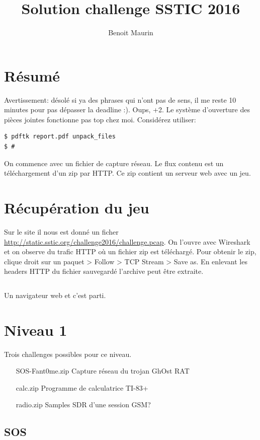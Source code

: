 \documentclass[14pt]{article}
\title{Solution challenge SSTIC 2016}
\author{Benoit Maurin}
\let\oldinputminted\inputminted
\renewcommand{\inputminted}[2]{\begin{tcolorbox}\oldinputminted[breaklines]{#1}{#2}\end{tcolorbox}}
\begin{document}
\date{}

\maketitle

\tableofcontents

\section*{Résumé}
Avertissement: désolé si ya des phrases qui n'ont pas de sens, il me reste 10 minutes pour pas dépasser la deadline :).
Oups, +2. Le système d'ouverture des pièces jointes fonctionne pas top chez moi.
Considérez utiliser:
\begin{verbatim}
$ pdftk report.pdf unpack_files 
$ #
\end{verbatim}

On commence avec un fichier de capture réseau. Le flux contenu est un téléchargement d'un zip par HTTP.
Ce zip contient un serveur web avec un jeu.

\section{Récupération du jeu}

Sur le site il nous est donné un ficher \url{http://static.sstic.org/challenge2016/challenge.pcap}.
On l'ouvre avec Wireshark et on observe du trafic HTTP où un fichier zip est téléchargé.
Pour obtenir le zip, clique droit sur un paquet > Follow > TCP Stream > Save as.
En enlevant les headers HTTP du fichier sauvegardé l'archive peut être extraite.

\inputminted{bash}{./sessions/recover_game.txt}

Un navigateur web et c'est parti.


\section{Niveau 1}

Trois challenges possibles pour ce niveau.
\begin{itemize}
\item[SOS-Fant0me.zip] Capture réseau du trojan GhOst RAT
\item[calc.zip] Programme de calculatrice TI-83+
\item[radio.zip] Samples SDR d'une session GSM?
\end{itemize}

\FloatBarrier
\subsection{SOS}
\end{document}
